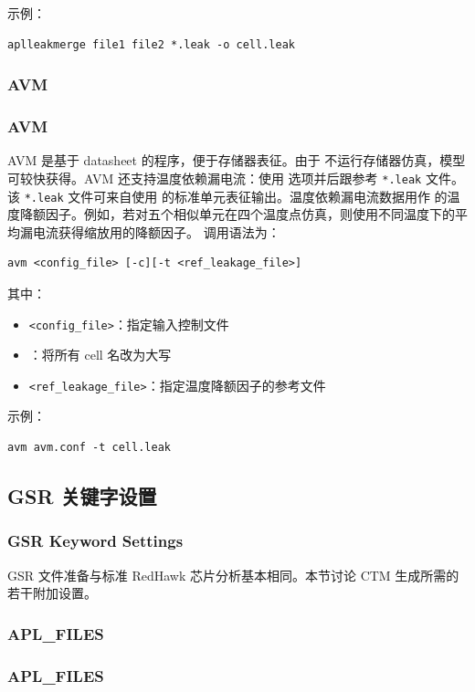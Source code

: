 示例：
\begin{lstlisting}
aplleakmerge file1 file2 *.leak -o cell.leak
\end{lstlisting}

\subsubsection{AVM}
\subsubsection*{AVM}

AVM 是基于 datasheet 的程序，便于存储器表征。由于  不运行存储器仿真，模型可较快获得。AVM 还支持温度依赖漏电流：使用  选项并后跟参考 \texttt{*.leak} 文件。该 \texttt{*.leak} 文件可来自使用  的标准单元表征输出。温度依赖漏电流数据用作  的温度降额因子。例如，若对五个相似单元在四个温度点仿真，则使用不同温度下的平均漏电流获得缩放用的降额因子。 调用语法为：
\begin{lstlisting}
avm <config_file> [-c][-t <ref_leakage_file>]
\end{lstlisting}
其中：
\begin{itemize}
  \item \texttt{<config\_file>}：指定输入控制文件
  \item {}：将所有 cell 名改为大写
  \item {} \texttt{<ref\_leakage\_file>}：指定温度降额因子的参考文件
\end{itemize}

示例：
\begin{lstlisting}
avm avm.conf -t cell.leak
\end{lstlisting}

\subsection{GSR 关键字设置}
\subsubsection*{GSR Keyword Settings}

GSR 文件准备与标准 RedHawk 芯片分析基本相同。本节讨论 CTM 生成所需的若干附加设置。

\subsubsection{APL\_FILES}
\subsubsection*{APL\_FILES}

